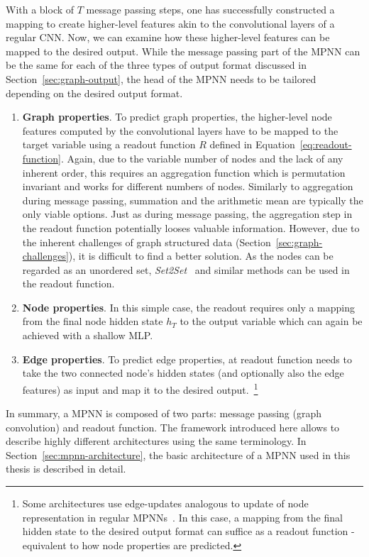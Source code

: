 With a block of $T$ message passing steps, one has successfully constructed a mapping to create higher-level features akin to the convolutional layers of a regular CNN. Now, we can examine how these higher-level features can be mapped to the desired output. While the message passing part of the MPNN can be the same for each of the three types of output format discussed in Section~\ref{sec:graph-output}, the head of the MPNN needs to be tailored depending on the desired output format.

\begin{enumerate}
	\item \textbf{Graph properties}. To predict graph properties, the higher-level node features computed by the convolutional layers have to be mapped to the target variable using a readout function $R$ defined in Equation~\ref{eq:readout-function}. Again, due to the variable number of nodes and the lack of any inherent order, this requires an aggregation function which is permutation invariant and works for different numbers of nodes. Similarly to aggregation during message passing, summation and the arithmetic mean are typically the only viable options.
	Just as during message passing, the aggregation step in the readout function potentially looses valuable information. However, due to the inherent challenges of graph structured data (Section~\ref{sec:graph-challenges}), it is difficult to find a better solution. As the nodes can be regarded as an unordered set, \textit{Set2Set}~\cite{Vinyals2015} and similar methods can be used in the readout function.
	\item \textbf{Node properties}. In this simple case, the readout requires only a mapping from the final node hidden state $h_T$ to the output variable which can again be achieved with a shallow MLP.
	\item \textbf{Edge properties}. To predict edge properties, at readout function needs to take the two connected node's hidden states (and optionally also the edge features) as input and map it to the desired output.~\footnote{Some architectures use edge-updates analogous to update of node representation in regular MPNNs~\cite{Jørgensen2018}. In this case, a mapping from the final hidden state to the desired output format can suffice as a readout function - equivalent to how node properties are predicted.}
\end{enumerate}


In summary, a MPNN is composed of two parts: message passing (graph convolution) and readout function. The framework introduced here allows to describe highly different architectures using the same terminology. In Section~\ref{sec:mpnn-architecture}, the basic architecture of a MPNN used in this thesis is described in detail.

